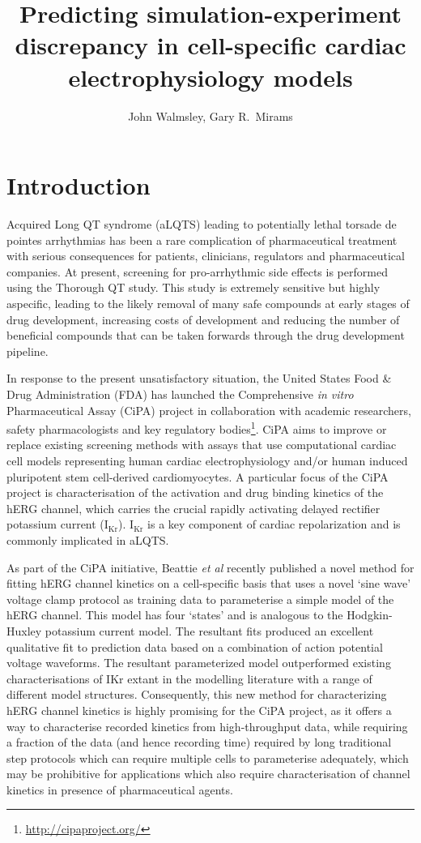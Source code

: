 \documentclass[11pt,a4paper,oneside]{article}
\author{John Walmsley, Gary R.~Mirams}
\title{Predicting simulation-experiment discrepancy in cell-specific cardiac electrophysiology models}
\begin{document}
\maketitle

\section{Introduction}

Acquired Long QT syndrome (aLQTS) leading to potentially lethal torsade de pointes arrhythmias has been a rare complication of pharmaceutical treatment with serious consequences for patients, clinicians, regulators and pharmaceutical companies\cite{Roden2004}. At present, screening for pro-arrhythmic side effects is performed using the Thorough QT study. This study is extremely sensitive but highly aspecific, leading to the likely removal of many safe compounds at early stages of drug development, increasing costs of development and reducing the number of beneficial compounds that can be taken forwards through the drug development pipeline.

In response to the present unsatisfactory situation, the United States Food \& Drug Administration (FDA) has launched the Comprehensive \textit{in vitro} Pharmaceutical Assay (CiPA) project in collaboration with academic researchers, safety pharmacologists and key regulatory bodies\footnote{\url{http://cipaproject.org/}}. CiPA aims to improve or replace existing screening methods with assays that use computational cardiac cell models representing human cardiac electrophysiology and/or human induced pluripotent stem cell-derived cardiomyocytes\cite{Colatsky2016}. A particular focus of the CiPA project is characterisation of the activation and drug binding kinetics of the hERG channel, which carries the crucial rapidly activating delayed rectifier potassium current (I$_{\text{Kr}}$). I$_{\text{Kr}}$ is a key component of cardiac repolarization and is commonly implicated in aLQTS.

As part of the CiPA initiative, Beattie \textit{et al} recently published a novel method for fitting hERG channel kinetics on a cell-specific basis that uses a novel `sine wave' voltage clamp protocol as training data to parameterise a simple model of the hERG channel\cite{Beattie2018}. This model has four `states' and is analogous to the Hodgkin-Huxley potassium current model. The resultant fits produced an excellent qualitative fit to prediction data based on a combination of action potential voltage waveforms. The resultant parameterized model outperformed existing characterisations of IKr extant in the modelling literature with a range of different model structures. Consequently, this new method for characterizing hERG channel kinetics is highly promising for the CiPA project, as it offers a way to characterise recorded kinetics from high-throughput data, while requiring a fraction of the data (and hence recording time) required by long traditional step protocols which can require multiple cells to parameterise adequately, which may be prohibitive for applications which also require characterisation of channel kinetics in presence of pharmaceutical agents.
\end{document}
